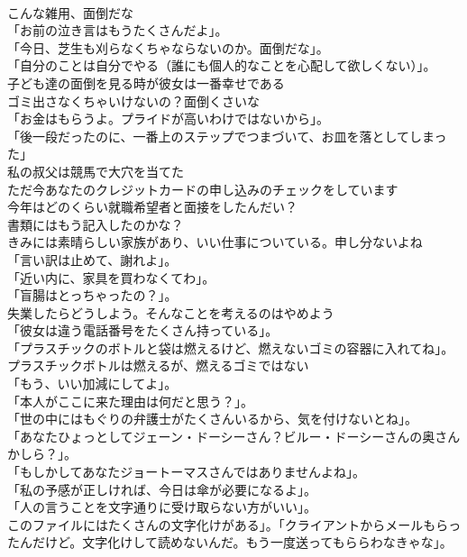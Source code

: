 \documentclass[8pt]{extreport}
\begin{document}
\begin{CJK}{UTF8}{min}
\\	こんな雑用、面倒だな	
\\	「お前の泣き言はもうたくさんだよ」。	
\\	「今日、芝生も刈らなくちゃならないのか。面倒だな」。	
\\	「自分のことは自分でやる（誰にも個人的なことを心配して欲しくない）」。	
\\	子ども達の面倒を見る時が彼女は一番幸せである	
\\	ゴミ出さなくちゃいけないの？面倒くさいな	
\\	「お金はもらうよ。プライドが高いわけではないから」。	
\\	「後一段だったのに、一番上のステップでつまづいて、お皿を落としてしまった」	
\\	私の叔父は競馬で大穴を当てた	
\\	ただ今あなたのクレジットカードの申し込みのチェックをしています	
\\	今年はどのくらい就職希望者と面接をしたんだい？	
\\	書類にはもう記入したのかな？	
\\	きみには素晴らしい家族があり、いい仕事についている。申し分ないよね	
\\	「言い訳は止めて、謝れよ」。	
\\	「近い内に、家具を買わなくてわ」。	
\\	「盲腸はとっちゃったの？」。	
\\	失業したらどうしよう。そんなことを考えるのはやめよう	
\\	「彼女は違う電話番号をたくさん持っている」。	
\\	「プラスチックのボトルと袋は燃えるけど、燃えないゴミの容器に入れてね」。	
\\	プラスチックボトルは燃えるが、燃えるゴミではない	
\\	「もう、いい加減にしてよ」。	
\\	「本人がここに来た理由は何だと思う？」。	
\\	「世の中にはもぐりの弁護士がたくさんいるから、気を付けないとね」。	
\\	「あなたひょっとしてジェーン・ドーシーさん？ビルー・ドーシーさんの奥さんかしら？」。	
\\	「もしかしてあなたジョートーマスさんではありませんよね」。	
\\	「私の予感が正しければ、今日は傘が必要になるよ」。	
\\	「人の言うことを文字通りに受け取らない方がいい」。	
\\	このファイルにはたくさんの文字化けがある」。「クライアントからメールもらったんだけど。文字化けして読めないんだ。もう一度送ってもららわなきゃな」。	

\end{CJK}
\end{document}
